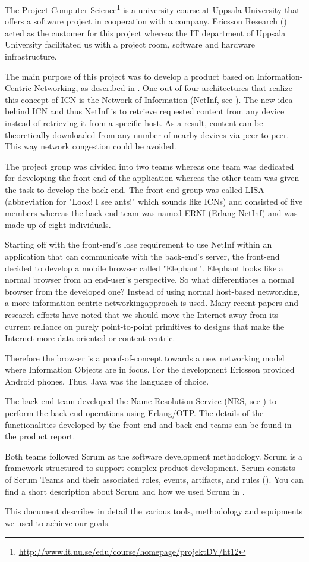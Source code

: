 The Project Computer Science\footnote{\url{http://www.it.uu.se/edu/course/homepage/projektDV/ht12}} is a university
course at Uppsala University that offers a software project in cooperation with a company. Ericsson Research (\cite{ericsson}) acted as 
the customer for this project whereas the IT department of Uppsala University facilitated us with a project room, software and hardware infrastructure.

The main purpose of this project was to develop a product based on Information-Centric Networking, as described in \cite{netinf}.
One out of four architectures that realize this concept of ICN is the Network of Information (NetInf, see \cite{netinf}). 
The new idea behind ICN and thus NetInf is to retrieve requested content from any device  instead of retrieving it from a specific host. 
As a result, content can be theoretically downloaded from any number of nearby devices via peer-to-peer. 
This way network congestion could be avoided.

The project group was divided into two teams whereas one team was dedicated for developing the front-end of the 
application whereas the other team was given the task to develop the back-end. The front-end group was called 
LISA (abbreviation for "Look! I see ants!" which sounds like ICNs) and consisted of five members whereas 
the back-end team was named ERNI (Erlang NetInf) and was made up of eight individuals. 

Starting off with the front-end's lose requirement to use NetInf within an application that can communicate with
the back-end's server, the front-end decided to develop a mobile browser called "Elephant". 
Elephant looks like a normal browser from an end-user's perspective. So what differentiates a 
normal browser from the developed one? Instead of using normal host-based networking, a more information-centric networkingapproach is used. 
Many recent papers and research efforts have noted that we should move the Internet 
away from its current reliance on purely point-to-point primitives to designs that make the Internet more data-oriented or content-centric. \cite{ghodsietal}  

Therefore the browser is a proof-of-concept towards a new networking model where Information Objects are in focus.
For the development Ericsson provided Android phones. Thus, Java was the language of choice.

The back-end team developed the Name Resolution Service (NRS, see \cite{netinf}) to perform the back-end operations using Erlang/OTP\cite{erlang}. 
The details of the functionalities developed 
by the front-end and back-end teams can be found in the product report. 

Both teams followed Scrum as the software development methodology. Scrum is a framework structured to support complex product development. Scrum consists of
Scrum Teams and their associated roles, events, artifacts, and rules (\cite{scrumpaper}).
You can find a short description about Scrum and
how we used Scrum in .

This document describes in detail the various tools, methodology and equipments we used to achieve our goals. 
